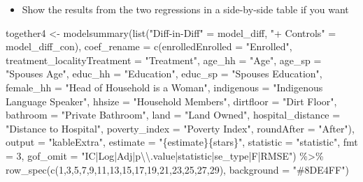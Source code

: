 \documentclass[
  letterpaper,
  DIV=11,
  numbers=noendperiod]{scrartcl}
\newenvironment{Shaded}{\begin{snugshade}}{\end{snugshade}}
\newcommand{\AttributeTok}[1]{\textcolor[rgb]{0.40,0.45,0.13}{#1}}
\newcommand{\DecValTok}[1]{\textcolor[rgb]{0.68,0.00,0.00}{#1}}
\newcommand{\FunctionTok}[1]{\textcolor[rgb]{0.28,0.35,0.67}{#1}}
\newcommand{\NormalTok}[1]{\textcolor[rgb]{0.00,0.23,0.31}{#1}}
\newcommand{\OtherTok}[1]{\textcolor[rgb]{0.00,0.23,0.31}{#1}}
\newcommand{\SpecialCharTok}[1]{\textcolor[rgb]{0.37,0.37,0.37}{#1}}
\newcommand{\StringTok}[1]{\textcolor[rgb]{0.13,0.47,0.30}{#1}}
\providecommand{\tightlist}{%
  \setlength{\itemsep}{0pt}\setlength{\parskip}{0pt}}\usepackage{longtable,booktabs,array}
\begin{document}
\begin{itemize}
\tightlist
\item
  Show the results from the two regressions in a side-by-side table if
  you want
\end{itemize}

\begin{Shaded}
\begin{Highlighting}[numbers=left,,]
\NormalTok{together4 }\OtherTok{\textless{}{-}} \FunctionTok{modelsummary}\NormalTok{(}\FunctionTok{list}\NormalTok{(}\StringTok{"Diff{-}in{-}Diff"} \OtherTok{=}\NormalTok{ model\_diff,}
                               \StringTok{"+ Controls"} \OtherTok{=}\NormalTok{ model\_diff\_con),}
             \AttributeTok{coef\_rename =} \FunctionTok{c}\NormalTok{(}\AttributeTok{enrolledEnrolled =} \StringTok{"Enrolled"}\NormalTok{,}
                             \AttributeTok{treatment\_localityTreatment =} \StringTok{"Treatment"}\NormalTok{,}
                             \AttributeTok{age\_hh =} \StringTok{"Age"}\NormalTok{,}
                             \AttributeTok{age\_sp =} \StringTok{"Spouse\textquotesingle{}s Age"}\NormalTok{,}
                             \AttributeTok{educ\_hh =} \StringTok{"Education"}\NormalTok{,}
                             \AttributeTok{educ\_sp =} \StringTok{"Spouse\textquotesingle{}s Education"}\NormalTok{,}
                             \AttributeTok{female\_hh =} \StringTok{"Head of Household is a Woman"}\NormalTok{,}
                             \AttributeTok{indigenous =} \StringTok{"Indigenous Language Speaker"}\NormalTok{,}
                             \AttributeTok{hhsize =} \StringTok{"Household Members"}\NormalTok{,}
                             \AttributeTok{dirtfloor =} \StringTok{"Dirt Floor"}\NormalTok{,}
                             \AttributeTok{bathroom =} \StringTok{"Private Bathroom"}\NormalTok{,}
                             \AttributeTok{land =} \StringTok{"Land Owned"}\NormalTok{,}
                             \AttributeTok{hospital\_distance =} \StringTok{"Distance to Hospital"}\NormalTok{,}
                             \AttributeTok{poverty\_index =} \StringTok{"Poverty Index"}\NormalTok{,}
                             \AttributeTok{roundAfter =} \StringTok{"After"}\NormalTok{),}
             \AttributeTok{output =} \StringTok{"kableExtra"}\NormalTok{,}
             \AttributeTok{estimate =} \StringTok{"\{estimate\}\{stars\}"}\NormalTok{,}
             \AttributeTok{statistic =} \StringTok{"statistic"}\NormalTok{,}
             \AttributeTok{fmt =}  \DecValTok{3}\NormalTok{,}
             \AttributeTok{gof\_omit =} \StringTok{"IC|Log|Adj|p}\SpecialCharTok{\textbackslash{}\textbackslash{}}\StringTok{.value|statistic|se\_type|F|RMSE"}\NormalTok{) }\SpecialCharTok{\%\textgreater{}\%} 
  \FunctionTok{row\_spec}\NormalTok{(}\FunctionTok{c}\NormalTok{(}\DecValTok{1}\NormalTok{,}\DecValTok{3}\NormalTok{,}\DecValTok{5}\NormalTok{,}\DecValTok{7}\NormalTok{,}\DecValTok{9}\NormalTok{,}\DecValTok{11}\NormalTok{,}\DecValTok{13}\NormalTok{,}\DecValTok{15}\NormalTok{,}\DecValTok{17}\NormalTok{,}\DecValTok{19}\NormalTok{,}\DecValTok{21}\NormalTok{,}\DecValTok{23}\NormalTok{,}\DecValTok{25}\NormalTok{,}\DecValTok{27}\NormalTok{,}\DecValTok{29}\NormalTok{), }\AttributeTok{background =} \StringTok{"\#8DE4FF"}\NormalTok{) }


\end{Highlighting}
\end{Shaded}
\end{document}
